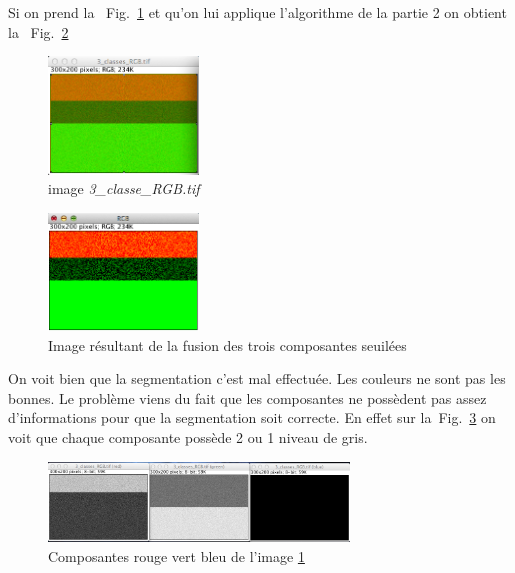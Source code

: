 \documentclass[a4paper,10pt]{article}
\begin{document}
Si on prend la ~Fig.~\ref{3_classe} et  qu'on lui applique l'algorithme de la partie 2 on obtient la ~Fig.~\ref{3_classe_gris_vert}


\begin{figure}[ht]
\begin{center}
	\includegraphics[width=4cm]{images/3_classe}
\end{center}
	\caption{image \emph{3\_classe\_RGB.tif}}
	\label{3_classe}
\end{figure}

\begin{figure}[ht]
\begin{center}
	\includegraphics[width=4cm]{images/3_classe_fusion}
\end{center}
	\caption{Image r\'esultant de la fusion des trois composantes seuil\'ees}
	\label{3_classe_gris_vert}
\end{figure}

On voit bien que la segmentation c'est mal effectu\'ee. Les couleurs ne sont pas les bonnes. Le probl\`eme viens du fait que les composantes ne poss\`edent pas assez d'informations pour que la segmentation soit correcte. En effet sur la~Fig.~\ref{3_classe_comp} on voit que chaque composante poss\`ede 2 ou 1 niveau de gris.

\begin{figure}[ht]
\begin{center}
	\includegraphics[width=8cm]{images/3_classe_comp}
\end{center}
	\caption{Composantes rouge vert bleu de l'image \ref{3_classe}}
	\label{3_classe_comp}
\end{figure}
\end{document}
